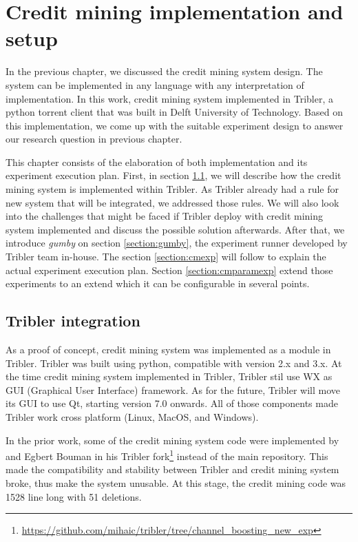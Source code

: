 \chapter{Credit mining implementation and setup}
\label{chp:implexperiment}
In the previous chapter, we discussed the credit mining system design. The system can be implemented in any language with any interpretation of implementation. In this work, credit mining system implemented in Tribler, a python torrent client that was built in Delft University of Technology. Based on this implementation, we come up with the suitable experiment design to answer our research question in previous chapter. 

This chapter consists of the elaboration of both implementation and its experiment execution plan. First, in section \ref{section:triblerintregration}, we will describe how the credit mining system is implemented within Tribler. As Tribler already had a rule for new system that will be integrated, we addressed those rules. We will also look into the challenges that might be faced if Tribler deploy with credit mining system implemented and discuss the possible solution afterwards. After that, we introduce \textit{gumby} on section \ref{section:gumby}, the experiment runner developed by Tribler team in-house. The section \ref{section:cmexp} will follow to explain the actual experiment execution plan. Section \ref{section:cmparamexp} extend those experiments to an extend which it can be configurable in several points.

\section{Tribler integration}
\label{section:triblerintregration}
As a proof of concept, credit mining system was implemented as a module in Tribler. Tribler was built using python, compatible with version 2.x and 3.x. At the time credit mining system implemented in Tribler, Tribler stil use WX as GUI (Graphical User Interface) framework. As for the future, Tribler will move its GUI to use Qt, starting version 7.0 onwards. All of those components made Tribler work cross platform (Linux, MacOS, and Windows).

In the prior work, some of the credit mining system code were implemented by \citeauthor{2015:creditmining:capota} and Egbert Bouman in his Tribler fork\footnote{\url{https://github.com/mihaic/tribler/tree/channel_boosting_new_exp}} instead of the main repository. This made the compatibility and stability between Tribler and credit mining system broke, thus make the system unusable. At this stage, the credit mining code was 1528 line long with 51 deletions.

